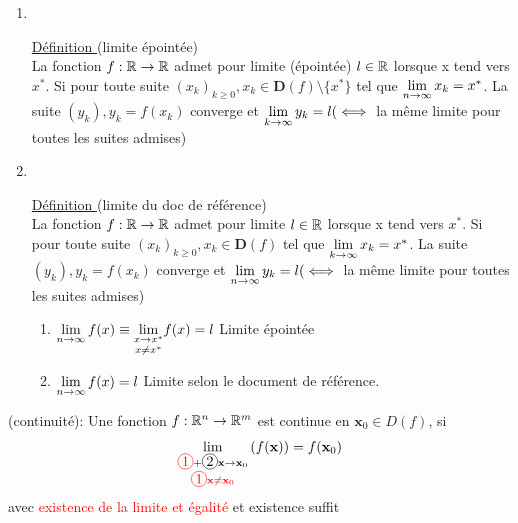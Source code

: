 \documentclass[12pt,a4paper]{article}
\begin{document}
	\begin{enumerate}
\item ~
\begin{boite}
 \underline{Définition }(limite épointée)\\
La fonction $f:\mathbb{R} \to \mathbb{R}$ admet pour limite (épointée) $l \in \mathbb{R}$ lorsque x tend vers $x^*$. Si pour toute suite $(x_k)_{k\geq 0}, x_k \in \mathbf{D}(f) \setminus \{x^*\}$ tel que $\lim\limits_{n \to \infty} x_k = x^{*}$. La suite $(y_k), y_k = f(x_k)$ converge et $\lim\limits_{k\to\infty} y_k = l (\iff$ la même limite pour toutes les suites admises) 
\end{boite}

	\item~
\begin{boite}
				\underline{Définition }(limite du doc de référence)\\
	La fonction $f:\mathbb{R} \to \mathbb{R}$ admet pour limite $l \in \mathbb{R}$ lorsque x tend vers $x^*$. Si pour toute suite $(x_k)_{k\geq 0}, x_k \in \mathbf{D}(f)$ tel que $\lim\limits_{k\to\infty} x_k = x^{*}$. La suite $(y_k), y_k = f(x_k)$ converge et $\lim\limits_{n \to \infty} y_k = l (\iff$ la même limite pour toutes les suites admises) 
\end{boite}
\begin{boite}

	\begin{enumerate}
		\item $\lim\limits_{n \to \infty} f(x) \equiv \underset{x \neq x^*}{\lim\limits_{x \to x^*}} f(x) = l$ Limite épointée
		\item $\lim\limits_{n \to \infty} f(x) = l$ Limite selon le document de référence.
	\end{enumerate}
\end{boite}
\end{enumerate}
\begin{boite}
	 (continuité): Une fonction $f: \mathbb{R}^n \to \mathbb{R}^m$ est continue en $\textbf{x}_0 \in D(f)$, si
	\begin{equation*}
		\llimite{\textcolor{red}{\circled{1}} + \circled{2} \textbf{x} \to \textbf{x}_0}{\textcolor{red}{\circled{1} \textbf{x} \neq \textbf{x}_0}}{f(\textbf{x})} = f(\textbf{x}_0)
	\end{equation*}
	avec \textcolor{red}{ existence de la limite et égalité} et  existence suffit
\end{boite}
\end{document}
